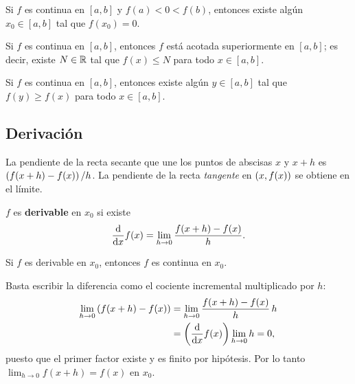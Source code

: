 \begin{teorema}
  \label{teo:valor_intermedio}
  Si $f$ es continua en $[a,b]$ y $f(a)<0<f(b)$, entonces existe alg\'un
  $x_0\in[a,b]$ tal que $f(x_0)=0$.
\end{teorema}

\begin{teorema}[Acotamiento]
  \label{teo:acotamiento}
  Si $f$ es continua en $[a,b]$, entonces $f$ est\'a acotada superiormente en
  $[a,b]$; es decir, existe $N\in\mathbb{R}$ tal que $f(x)\le N$ para todo
  $x\in[a,b]$.
\end{teorema}

\begin{teorema}
  \label{teo:valor_extremo}
  Si $f$ es continua en $[a,b]$, entonces existe alg\'un $y\in[a,b]$ tal que
  $f(y)\ge f(x)$ para todo $x\in[a,b]$.
\end{teorema}

\subsection{Derivaci\'on}
\label{subsec:derivacion_1d}

La pendiente de la recta secante que une los puntos de abscisas $x$ y $x+h$ es
$\left( f(x+h)-f(x) \right)/h$. La pendiente de la recta \emph{tangente} en
$\left( x,f(x) \right)$ se obtiene en el l\'imite.

\begin{definicion}[Derivada]
  \label{def:derivada_1d}
  $f$ es \textbf{derivable} en $x_0$ si existe
  \begin{equation}
    \label{eq:derivada_1d}
    \frac{\mathrm{d}}{\mathrm{d}x}f(x)=\lim_{h\rightarrow 0}\frac{f(x+h)-f(x)}{h}.
  \end{equation}
\end{definicion}

\begin{teorema}
  \label{teo:derivable_continua}
  Si $f$ es derivable en $x_0$, entonces $f$ es continua en $x_0$.
\end{teorema}

\begin{demostracion}
  Basta escribir la diferencia como el cociente incremental multiplicado por
  $h$:
  \begin{equation}
    \label{eq:demo_continuidad}
    \begin{aligned}
      \lim_{h\rightarrow 0}\left( f(x+h)-f(x) \right)
        &=\lim_{h\rightarrow 0}\frac{f(x+h)-f(x)}{h}\,h\\
        &=\left( \frac{\mathrm{d}}{\mathrm{d}x}f(x) \right)\lim_{h\rightarrow 0}h=0 ,
    \end{aligned}
  \end{equation}
  puesto que el primer factor existe y es finito por hip\'otesis. Por lo tanto
  $\lim_{h\rightarrow 0}f(x+h)=f(x)$ en $x_0$.
\end{demostracion}

